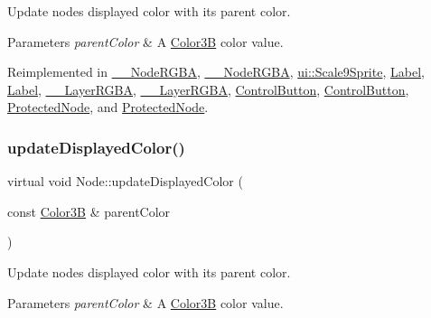 Update node\textquotesingle{}s displayed color with its parent color. 
\begin{DoxyParams}{Parameters}
{\em parent\+Color} & A \hyperlink{structColor3B}{Color3B} color value. \\
\hline
\end{DoxyParams}


Reimplemented in \hyperlink{class____NodeRGBA_a7b792b469020beebcd515a2eacba90f7}{\+\_\+\+\_\+\+Node\+R\+G\+BA}, \hyperlink{class____NodeRGBA_a7b792b469020beebcd515a2eacba90f7}{\+\_\+\+\_\+\+Node\+R\+G\+BA}, \hyperlink{classui_1_1Scale9Sprite_a130c78092b506d4b06fec469e80c554c}{ui\+::\+Scale9\+Sprite}, \hyperlink{classLabel_a5810437c76649477d86f278a15e5f260}{Label}, \hyperlink{classLabel_a22ddaa3b9fb25f6295dcd5ac9545202b}{Label}, \hyperlink{class____LayerRGBA_aa0406779f58fc6586f51129bee7aed36}{\+\_\+\+\_\+\+Layer\+R\+G\+BA}, \hyperlink{class____LayerRGBA_aa0406779f58fc6586f51129bee7aed36}{\+\_\+\+\_\+\+Layer\+R\+G\+BA}, \hyperlink{classControlButton_ab493879910cbb468f4f510a3e9393203}{Control\+Button}, \hyperlink{classControlButton_a3f7857c3ce4bec5b375db1a6efea5920}{Control\+Button}, \hyperlink{classProtectedNode_ab628cf3ac452302f0c653600bb145b49}{Protected\+Node}, and \hyperlink{classProtectedNode_a53b09aefb1db2c87f6ee6560b0c48430}{Protected\+Node}.

\mbox{\label{classNode_a9e96bdf8038cd786486941f2f5a712ea}} 
\subsubsection{\texorpdfstring{update\+Displayed\+Color()}{updateDisplayedColor()}\hspace{0.1cm}{\footnotesize\ttfamily [2/2]}}
{\footnotesize\ttfamily virtual void Node\+::update\+Displayed\+Color (\begin{DoxyParamCaption}\item[{const \hyperlink{structColor3B}{Color3B} \&}]{parent\+Color }\end{DoxyParamCaption})\hspace{0.3cm}{\ttfamily [virtual]}}

Update node\textquotesingle{}s displayed color with its parent color. 
\begin{DoxyParams}{Parameters}
{\em parent\+Color} & A \hyperlink{structColor3B}{Color3B} color value. \\
\hline
\end{DoxyParams}


